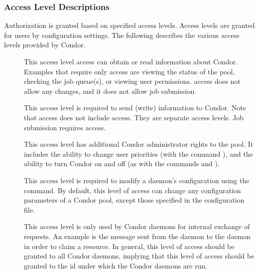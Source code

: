 \subsubsection{\label{sec:Security-access-levels} Access Level Descriptions}
Authorization is granted based on specified access levels.
Access levels are granted for users by configuration settings.
The following describes the various access levels provided
by Condor.

\begin{description}

\item[] \label{sec-level-read} This access level
   access can obtain or read information about Condor.
   Examples that require only  access are
   viewing the status of the pool, checking the job queue(s),
   or viewing user permissions.
    access does not allow any
   changes, and it does not allow job submission.

\item[] \label{sec-level-write} This access level
   is required to send (write) information to Condor.
   Note that  access does not include  access.
   They are separate access levels.
   Job submission requires  access.

\item[] \label{sec-level-administrator} This
   access level has additional Condor
   administrator rights to the pool.  It includes the ability to
   change user priorities (with the command ),
   and the ability to turn Condor on and off
   (as with the commands  and ).

\item[] \label{sec-level-config} This access level is
   required to modify a daemon's configuration using
   the  command.
   By default, this level of access can
   change any configuration parameters of a Condor pool,
   except those specified in
   the  configuration file.

\item[] \label{sec-level-immfamily} 
   This access level is only used by Condor daemons for internal
   exchange of requests.
   An example is the message sent from the  daemon
   to the  daemon in order to claim a resource.
   In general, this level of access should be granted to all Condor
   daemons, implying that this level of access should be granted
   to the id under which the Condor daemons are run.


\end{description}

